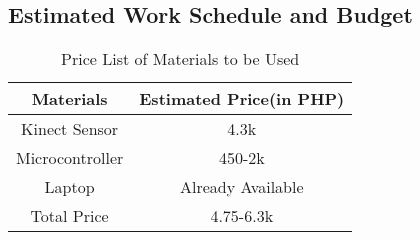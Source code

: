 \subsection{Estimated Work Schedule and Budget}
\begin{table}[!htb]
	\caption{Price List of Materials to be Used}
	\centering
	\begin{tabular}{|c|c|}
		\hline
		Materials & Estimated Price(in PHP) \\
		\hline
		Kinect Sensor & 4.3k \\
		\hline
		Microcontroller & 450-2k \\
		\hline
		Laptop & Already Available \\
		\hline
		Total Price & 4.75-6.3k \\
		\hline
	\end{tabular}
\end{table}